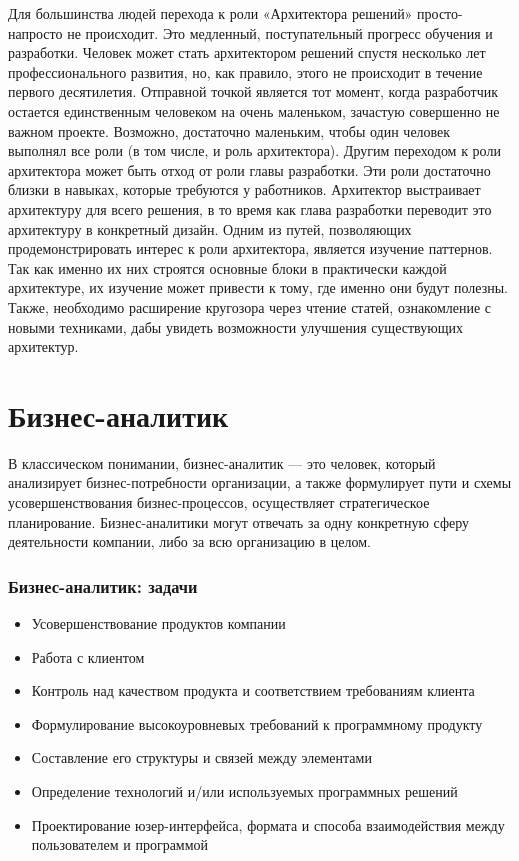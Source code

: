 \documentclass{../industrial-development}
\begin{document}
\lecturenotes
Для большинства людей перехода к роли «Архитектора решений» просто-напросто не происходит. Это медленный, поступательный прогресс обучения и разработки. Человек может стать архитектором решений спустя несколько лет профессионального развития, но, как правило, этого не происходит в течение первого десятилетия. 
Отправной точкой является тот момент, когда разработчик остается единственным человеком на очень маленьком, зачастую совершенно не важном проекте. Возможно, достаточно маленьким, чтобы один человек выполнял все роли (в том числе, и роль архитектора). 
Другим переходом к роли архитектора может быть отход от роли главы разработки. Эти роли достаточно близки в навыках, которые требуются у работников. Архитектор выстраивает архитектуру для всего решения, в то время как глава разработки переводит это архитектуру в конкретный дизайн. 
Одним из путей, позволяющих продемонстрировать интерес к роли архитектора, является изучение паттернов. Так как именно их них строятся основные блоки в практически каждой архитектуре, их изучение может привести к тому, где именно они будут полезны. Также, необходимо расширение кругозора через чтение статей, ознакомление с новыми техниками, дабы увидеть возможности улучшения существующих архитектур. 

\section{Бизнес-аналитик }

\lecturenotes

В классическом понимании, бизнес-аналитик — это человек, который анализирует бизнес-потребности организации, а также формулирует пути и схемы усовершенствования бизнес-процессов, осуществляет стратегическое планирование. Бизнес-аналитики могут отвечать за одну конкретную сферу деятельности компании, либо за всю организацию в целом.   ~\cite{Business}

\begin{frame} \frametitle{Бизнес-аналитик: задачи}
  \begin{itemize}
  \item Усовершенствование продуктов компании
  \item Работа с клиентом
  \item Контроль над качеством продукта и соответствием требованиям клиента
  \item Формулирование высокоуровневых требований к программному продукту
  \item Составление его структуры и связей между элементами
\item Определение технологий и/или используемых программных решений
\item Проектирование юзер-интерфейса, формата и способа взаимодействия между пользователем и программой
  \end{itemize}
\end{frame}
\end{document}
